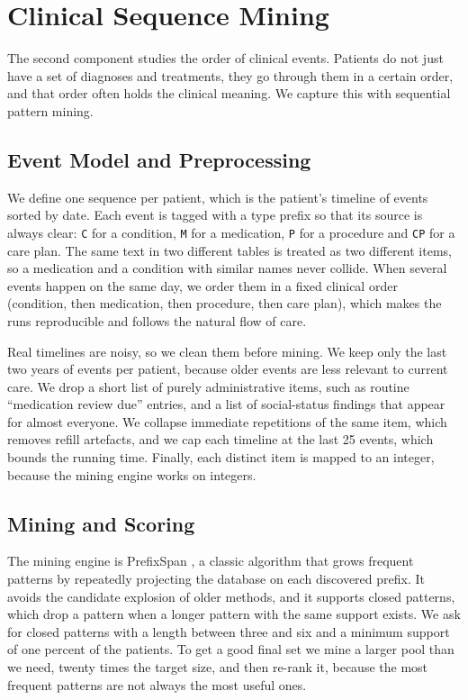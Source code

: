 
\section{Clinical Sequence Mining}
\label{sec:mining}

The second component studies the order of clinical events. Patients do not just have a set of diagnoses and treatments, they go through them in a certain order, and that order often holds the clinical meaning. We capture this with sequential pattern mining.

\subsection{Event Model and Preprocessing}

We define one sequence per patient, which is the patient's timeline of events sorted by date. Each event is tagged with a type prefix so that its source is always clear: \texttt{C} for a condition, \texttt{M} for a medication, \texttt{P} for a procedure and \texttt{CP} for a care plan. The same text in two different tables is treated as two different items, so a medication and a condition with similar names never collide. When several events happen on the same day, we order them in a fixed clinical order (condition, then medication, then procedure, then care plan), which makes the runs reproducible and follows the natural flow of care.

Real timelines are noisy, so we clean them before mining. We keep only the last two years of events per patient, because older events are less relevant to current care. We drop a short list of purely administrative items, such as routine ``medication review due'' entries, and a list of social-status findings that appear for almost everyone. We collapse immediate repetitions of the same item, which removes refill artefacts, and we cap each timeline at the last 25 events, which bounds the running time. Finally, each distinct item is mapped to an integer, because the mining engine works on integers.

\subsection{Mining and Scoring}

The mining engine is PrefixSpan \cite{pei2004prefixspan}, a classic algorithm that grows frequent patterns by repeatedly projecting the database on each discovered prefix. It avoids the candidate explosion of older methods, and it supports closed patterns, which drop a pattern when a longer pattern with the same support exists. We ask for closed patterns with a length between three and six and a minimum support of one percent of the patients. To get a good final set we mine a larger pool than we need, twenty times the target size, and then re-rank it, because the most frequent patterns are not always the most useful ones.

